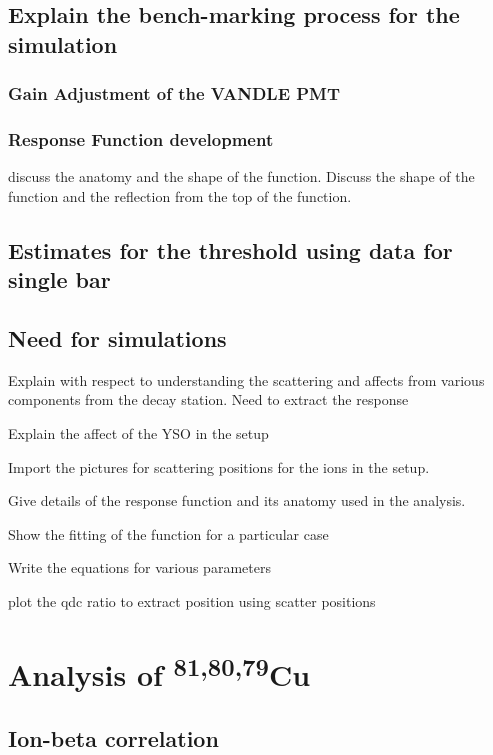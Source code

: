 \subsection{Explain the bench-marking process for the simulation}
\subsubsection{Gain Adjustment of the VANDLE PMT}
\subsubsection{Response Function development}

discuss the anatomy and the shape of the function. Discuss the shape of the function and the reflection from the top of the function.
\subsection{Estimates for the threshold using data for single bar}
\subsection{}

\subsection{Need for simulations}
Explain with respect to understanding the scattering and affects from various components from the decay station. Need to extract the response

Explain the affect of the YSO in the setup

Import the pictures for scattering positions for the ions in the setup.

Give details of the response function and its anatomy used in the analysis.

Show the fitting of the function for a particular case

Write the equations for various parameters

plot the qdc ratio to extract position using scatter positions


\section{Analysis of \textsuperscript{81,80,79}Cu}
\subsection{Ion-beta correlation}
